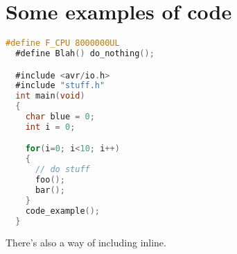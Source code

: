 \section{Some examples of code}
\begin{lstlisting}[language=C]
  #define F_CPU 8000000UL
  #define Blah() do_nothing();

  #include <avr/io.h>
  #include "stuff.h"
  int main(void)
  {
    char blue = 0;
    int i = 0;

    for(i=0; i<10; i++)
    {
      // do stuff
      foo();
      bar();
    }
    code_example();
  }
\end{lstlisting}

There's also a way of including  inline.




